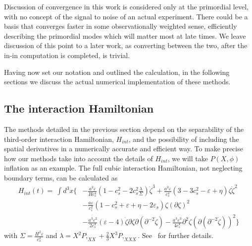 \documentclass[a4paper,12pt]{extarticle}
\newcommand{\Hint}{H_{int}}
\begin{document}
Discussion of convergence in this work is considered only at the primordial level,
with no concept of the signal to noise of an actual experiment.
There could be a basis that converges faster in some observationally weighted sense,
efficiently describing the primordial modes which will matter most at late times.
We leave discussion of this point to a later work, as converting between the two,
after the in-in computation is completed, is trivial.


Having now set our notation and outlined the calculation, in the following sections we
discuss the actual numerical implementation of these methods.


\subsection{The interaction Hamiltonian}\label{sec:h_int}
The methods detailed in the previous section depend on the separability of
the third-order interaction Hamiltonian, $\Hint$,
and the possibility of including the spatial derivatives in a
numerically accurate and efficient way.
To make precise how our methods take into account the details of
$\Hint$, we will take $P(X,\phi)$ inflation as an example.
The full cubic interaction Hamiltonian, not neglecting boundary terms,
can be calculated as~\cite{px_burrage,chen_ng_0605,seery_ng_0503}
\begin{align}
    \Hint(t)=\ \int d^3x\bigg\{& -\frac{a^3\varepsilon}{H c_s^4}\left(1-c_s^{2}-2c_s^{2}\frac{\lambda}{\Sigma}\right)\dot{\zeta}^3
		+ \frac{a^3\varepsilon}{c_s^{4}}\left(3-3c_s^2-\varepsilon+\eta\right) \zeta\dot{\zeta}^2\nonumber\\
		&- \frac{a\varepsilon}{c_s^{2}}\left(1-c_s^2+\varepsilon+\eta-2\varepsilon_s\right) \zeta(\partial\zeta)^2\nonumber\\
        &- \frac{a^3\varepsilon^2}{2c_s^{4}}(\varepsilon-4)\dot{\zeta}\partial\zeta\partial(\partial^{-2}\dot{\zeta})
        - \frac{a^3\varepsilon^3}{4c_s^4}\partial^2\zeta(\partial(\partial^{-2}\dot{\zeta}))^2\bigg\}\label{interaction_loc}
\end{align}
with $\Sigma=\frac{H^2\varepsilon}{c^2_s}$
and $\lambda = X^2P,_{XX}+\frac{2}{3}X^3P,_{XXX}$.
See~\cite{px_burrage} for further details.
\end{document}
